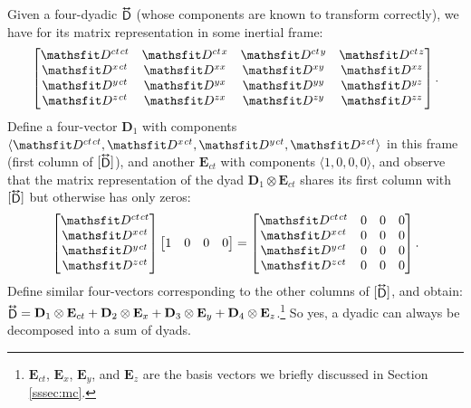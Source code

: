 \documentclass[12pt]{article}
\renewcommand{\vv}[1]{\mathbf{#1}}
\newcommand{\tightoverset}[2]{%
  \mathop{#2}\limits^{\vbox to -.5ex{\kern-0.75ex\hbox{$#1$}\vss}}}
\newcommand{\inlinedy}[1]{\tightoverset{\text{\tiny$\bm\leftrightarrow$}}{#1}}
\begin{document}
Given a four-dyadic $\inlinedy{\mathsf{D}}$ (whose components are known to transform correctly), we have for its matrix representation in some inertial frame:
\begin{equation*}
\begin{bmatrix}
\mathsfit D^{ct \mkern1.5mu ct} & \mathsfit D^{ct \mkern1.5mu x} & \mathsfit D^{ct \mkern1.5mu y} & \mathsfit D^{ct \mkern1.5mu z} \\
\mathsfit D^{x \mkern1.5mu ct} & \mathsfit D^{x x} & \mathsfit D^{x y} & \mathsfit D^{x z}  \\
\mathsfit D^{y \mkern1.5mu ct} & \mathsfit D^{y x} & \mathsfit D^{y y} & \mathsfit D^{y z}  \\
\mathsfit D^{z \mkern1.5mu ct} & \mathsfit D^{z x} & \mathsfit D^{z y} & \mathsfit D^{z z} 
\end{bmatrix}.
\end{equation*}
Define a four-vector $\vv D_1$ with components $\langle \mathsfit D^{ct \mkern1.5mu ct}, \mathsfit D^{x \mkern1.5mu ct}, \mathsfit D^{y \mkern1.5mu ct}, \mathsfit D^{z \mkern1.5mu ct} \rangle$ in this frame (first column of $[ \inlinedy{\mathsf{D}} ]$), and another $\vv E_{ct}$ with components $\langle 1, 0, 0, 0 \rangle$, and observe that the matrix representation of the dyad $\vv D_1 \otimes \vv E_{ct}$ shares its first column with $[ \inlinedy{\mathsf{D}} ]$ but otherwise has only zeros:
\begin{equation*}
\begin{bmatrix}
\mathsfit D^{ct \mkern1.5mu ct} \\
\mathsfit D^{x \mkern1.5mu ct} \\
 \mathsfit D^{y \mkern1.5mu ct} \\
\mathsfit D^{z \mkern1.5mu ct}
\end{bmatrix}
\begin{bmatrix}
1 & 0 & 0 & 0
\end{bmatrix}
=
\begin{bmatrix}
\mathsfit D^{ct \mkern1.5mu ct} & 0 & 0 & 0 \\
\mathsfit D^{x \mkern1.5mu ct} & 0 & 0 & 0 \\
\mathsfit D^{y \mkern1.5mu ct} & 0 & 0 & 0 \\
\mathsfit D^{z \mkern1.5mu ct} & 0 & 0 & 0
\end{bmatrix}.
\end{equation*}
Define similar four-vectors corresponding to the other columns of $[ \inlinedy{\mathsf{D}} ]$, and obtain: $\inlinedy{\mathsf{D}} = \vv D_1 \otimes \vv E_{ct} + \vv D_2 \otimes \vv E_{x} + \vv D_3 \otimes \vv E_{y} + \vv D_4 \otimes \vv E_{z}$.\footnote{$\vv E_{ct}$, $\vv E_{x}$, $\vv E_{y}$, and $\vv E_{z}$ are the basis vectors we briefly discussed in Section \ref{sssec:mc}.} So yes, a dyadic can always be decomposed into a sum of dyads.
\end{document}
